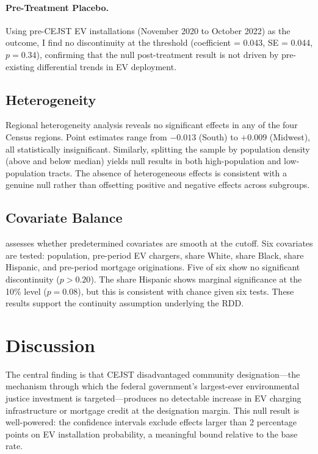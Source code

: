 \documentclass[12pt]{article}
\begin{document}
\paragraph{Pre-Treatment Placebo.} Using pre-CEJST EV installations (November 2020 to October 2022) as the outcome, I find no discontinuity at the threshold (coefficient = 0.043, SE = 0.044, $p = 0.34$), confirming that the null post-treatment result is not driven by pre-existing differential trends in EV deployment.

\subsection{Heterogeneity}

Regional heterogeneity analysis reveals no significant effects in any of the four Census regions. Point estimates range from $-0.013$ (South) to $+0.009$ (Midwest), all statistically insignificant. Similarly, splitting the sample by population density (above and below median) yields null results in both high-population and low-population tracts. The absence of heterogeneous effects is consistent with a genuine null rather than offsetting positive and negative effects across subgroups.

\subsection{Covariate Balance}



 assesses whether predetermined covariates are smooth at the cutoff. Six covariates are tested: population, pre-period EV chargers, share White, share Black, share Hispanic, and pre-period mortgage originations. Five of six show no significant discontinuity ($p > 0.20$). The share Hispanic shows marginal significance at the 10\% level ($p = 0.08$), but this is consistent with chance given six tests. These results support the continuity assumption underlying the RDD.

\section{Discussion}

The central finding is that CEJST disadvantaged community designation---the mechanism through which the federal government's largest-ever environmental justice investment is targeted---produces no detectable increase in EV charging infrastructure or mortgage credit at the designation margin. This null result is well-powered: the confidence intervals exclude effects larger than 2 percentage points on EV installation probability, a meaningful bound relative to the base rate.
\end{document}
